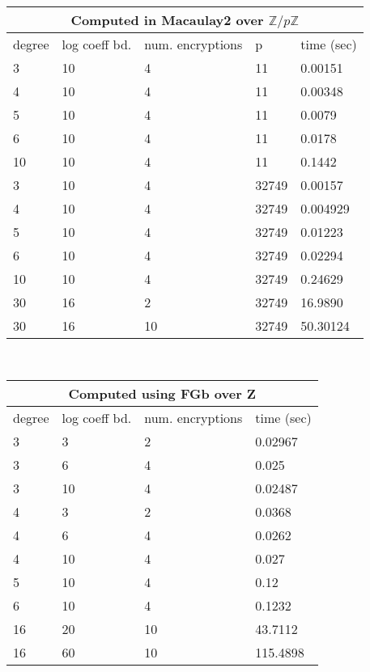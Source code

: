 \documentclass[11pt]{report}
\newcommand{\Zp}{\mathbb{Z}/p\mathbb{Z}}
\begin{document}
\

\begin{center}
\begin{tabular}{|l|l|l|l|l|}
\hline
\multicolumn{5}{|c|}{Computed in Macaulay2 over $\Zp$} \\
\hline
degree & log coeff bd. & num. encryptions & p & time (sec)\\
\hline
3 & 10 & 4 & 11 & 0.00151\\
\hline
4 & 10 & 4 & 11 &  0.00348\\
\hline
5 & 10 & 4 & 11 & 0.0079\\
\hline
6 & 10 & 4 & 11 & 0.0178\\
\hline
10 & 10 & 4 & 11 & 0.1442\\
\hline 
3 & 10 & 4 & 32749 & 0.00157\\
\hline
4 & 10 & 4 & 32749 & 0.004929\\
\hline
5 & 10 & 4 & 32749 & 0.01223\\
\hline
6 & 10 & 4 & 32749 & 0.02294\\
\hline
10 & 10 & 4 & 32749 & 0.24629\\
\hline
30 & 16 & 2 & 32749 & 16.9890 \\
\hline
30 & 16 & 10 & 32749 & 50.30124 \\
\hline
\end{tabular}
\end{center}

\

\begin{center}
\begin{tabular}{|l|l|l|l|}
\hline
\multicolumn{4}{|c|}{Computed using FGb over Z} \\
\hline
degree & log coeff bd. & num. encryptions & time (sec)\\
\hline
3 & 3 & 2 & 0.02967\\
\hline
3 & 6 & 4 & 0.025\\
\hline
3 & 10 & 4 & 0.02487 \\
\hline
4 & 3 & 2 & 0.0368\\
\hline
4 & 6 & 4 &  0.0262\\
\hline
4 & 10 & 4 & 0.027\\
\hline
5 & 10 & 4 & 0.12\\
\hline
6 & 10 & 4 & 0.1232\\
\hline
16 & 20 & 10 & 43.7112 \\
\hline
16 & 60 & 10 & 115.4898 \\
\hline
\end{tabular}
\end{center}
\end{document}
